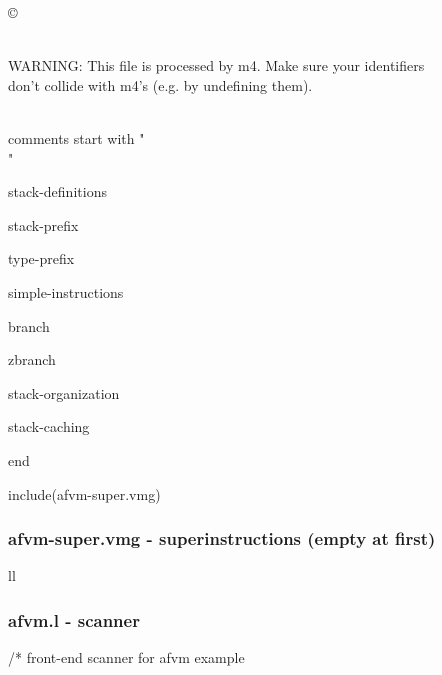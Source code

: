 \documentclass[10pt,english]{article}
\begin{document}
\LA{}\copyright~{\nwtagstyle{}}\RA{}

\\ WARNING: This file is processed by m4. Make sure your identifiers
\\ don't collide with m4's (e.g. by undefining them).

\\ comments start with "\\ "

\LA{}stack-definitions~{\nwtagstyle{}}\RA{}

\LA{}stack-prefix~{\nwtagstyle{}}\RA{}

\LA{}type-prefix~{\nwtagstyle{}}\RA{}

\LA{}simple-instructions~{\nwtagstyle{}}\RA{}

\LA{}branch~{\nwtagstyle{}}\RA{}

\LA{}zbranch~{\nwtagstyle{}}\RA{}

\LA{}stack-organization~{\nwtagstyle{}}\RA{}

\LA{}stack-caching~{\nwtagstyle{}}\RA{}

\LA{}end~{\nwtagstyle{}}\RA{}

include(afvm-super.vmg)
\nwendcode{}\nwdocspar


\subsubsection{afvm-super.vmg - superinstructions (empty at first)}

\nwenddocs{}\endmoddef
\LA{}ll~{\nwtagstyle{}}\RA{}
\nwendcode{}\nwdocspar


\subsubsection{afvm.l - scanner}

\nwenddocs{}\endmoddef
/* front-end scanner for afvm example
\end{document}
